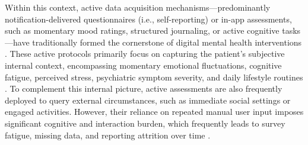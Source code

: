 Within this context, active data acquisition mechanisms—predominantly notification-delivered questionnaires (i.e., self-reporting) or in-app assessments, such as momentary mood ratings, structured journaling, or active cognitive tasks—have traditionally formed the cornerstone of digital mental health interventions \cite{kraft2024mobile, oudin2023digital}. These active protocols primarily focus on capturing the patient's subjective internal context, encompassing momentary emotional fluctuations, cognitive fatigue, perceived stress, psychiatric symptom severity, and daily lifestyle routines \cite{stone2023evaluation, myingermeys2018esm}. To complement this internal picture, active assessments are also frequently deployed to query external circumstances, such as immediate social settings or engaged activities. However, their reliance on repeated manual user input imposes significant cognitive and interaction burden, which frequently leads to survey fatigue, missing data, and reporting attrition over time \cite{langener2023capturing}.

